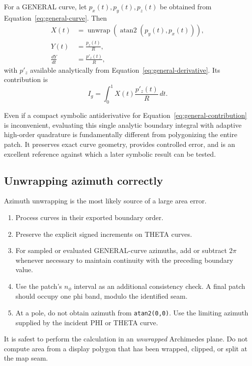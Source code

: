 \documentclass[11pt]{article}
\newcommand{\field}[1]{\texttt{#1}}
\begin{document}
For a GENERAL curve, let $p_x(t),p_y(t),p_z(t)$ be obtained from
Equation~\eqref{eq:general-curve}.  Then
\begin{align}
  X(t)&=\operatorname{unwrap}\!\left(\operatorname{atan2}
           (p_y(t),p_x(t))\right),\\
  Y(t)&=\frac{p_z(t)}{R},\\
  \frac{dY}{dt}&=\frac{p'_z(t)}{R},
\end{align}
with $p'_z$ available analytically from
Equation~\eqref{eq:general-derivative}.  Its contribution is
\begin{equation}
  I_g=\int_0^1 X(t)\frac{p'_z(t)}{R}\,dt.
  \label{eq:general-contribution}
\end{equation}

Even if a compact symbolic antiderivative for Equation~\eqref{eq:general-contribution}
is inconvenient, evaluating this single analytic boundary integral with
adaptive high-order quadrature is fundamentally different from polygonizing
the entire patch.  It preserves exact curve geometry, provides controlled
error, and is an excellent reference against which a later symbolic result can
be tested.

\subsection{Unwrapping azimuth correctly}

Azimuth unwrapping is the most likely source of a large area error.

\begin{enumerate}
  \item Process curves in their exported boundary order.
  \item Preserve the explicit signed increments on THETA curves.
  \item For sampled or evaluated GENERAL-curve azimuths, add or subtract
        $2\pi$ whenever necessary to maintain continuity with the preceding
        boundary value.
  \item Use the patch's $n_\phi$ interval as an additional consistency check.
        A final patch should occupy one phi band, modulo the identified seam.
  \item At a pole, do not obtain azimuth from \field{atan2(0,0)}.  Use the
        limiting azimuth supplied by the incident PHI or THETA curve.
\end{enumerate}

It is safest to perform the calculation in an \emph{unwrapped} Archimedes
plane.  Do not compute area from a display polygon that has been wrapped,
clipped, or split at the map seam.
\end{document}

